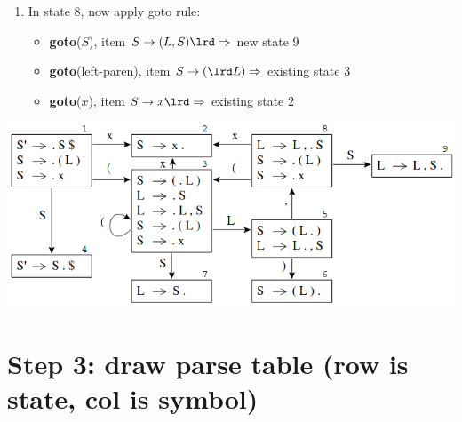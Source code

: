 \begin{enumerate}
\begin{center}
  \end{center}
\item In state 8, now apply goto rule:
  \begin{itemize}
  \item \textbf{goto}($S$), item $S\to (L,S)\lrd \Rightarrow$ new state 9
    \begin{center}
    \end{center}
  \item \textbf{goto}(\textsf{left-paren}), item $S\to (\lrd L) \Rightarrow$ existing state 3
  \item \textbf{goto}($x$), item $S\to x\lrd \Rightarrow$ existing state 2
  \end{itemize}
\end{enumerate}
\includegraphics[width=\linewidth]{img/LR0}
\section*{Step 3: draw parse table (row is state, col is symbol)}

